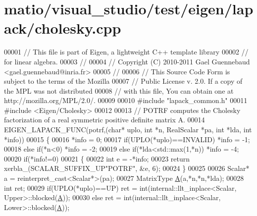 \hypertarget{matio_2visual__studio_2test_2eigen_2lapack_2cholesky_8cpp_source}{}\section{matio/visual\+\_\+studio/test/eigen/lapack/cholesky.cpp}
\label{matio_2visual__studio_2test_2eigen_2lapack_2cholesky_8cpp_source}

\begin{DoxyCode}
00001 \textcolor{comment}{// This file is part of Eigen, a lightweight C++ template library}
00002 \textcolor{comment}{// for linear algebra.}
00003 \textcolor{comment}{//}
00004 \textcolor{comment}{// Copyright (C) 2010-2011 Gael Guennebaud <gael.guennebaud@inria.fr>}
00005 \textcolor{comment}{//}
00006 \textcolor{comment}{// This Source Code Form is subject to the terms of the Mozilla}
00007 \textcolor{comment}{// Public License v. 2.0. If a copy of the MPL was not distributed}
00008 \textcolor{comment}{// with this file, You can obtain one at http://mozilla.org/MPL/2.0/.}
00009 
00010 \textcolor{preprocessor}{#include "lapack\_common.h"}
00011 \textcolor{preprocessor}{#include <Eigen/Cholesky>}
00012 
00013 \textcolor{comment}{// POTRF computes the Cholesky factorization of a real symmetric positive definite matrix A.}
00014 EIGEN\_LAPACK\_FUNC(potrf,(\textcolor{keywordtype}{char}* uplo, \textcolor{keywordtype}{int} *n, RealScalar *pa, \textcolor{keywordtype}{int} *lda, \textcolor{keywordtype}{int} *info))
00015 \{
00016   *info = 0;
00017         \textcolor{keywordflow}{if}(UPLO(*uplo)==INVALID) *info = -1;
00018   \textcolor{keywordflow}{else}  \textcolor{keywordflow}{if}(*n<0)                 *info = -2;
00019   \textcolor{keywordflow}{else}  \textcolor{keywordflow}{if}(*lda<std::max(1,*n))  *info = -4;
00020   \textcolor{keywordflow}{if}(*info!=0)
00021   \{
00022     \textcolor{keywordtype}{int} e = -*info;
00023     \textcolor{keywordflow}{return} xerbla\_(SCALAR\_SUFFIX\_UP\textcolor{stringliteral}{"POTRF"}, &e, 6);
00024   \}
00025 
00026   Scalar* a = \textcolor{keyword}{reinterpret\_cast<}Scalar*\textcolor{keyword}{>}(pa);
00027   MatrixType \hyperlink{group___core___module_class_eigen_1_1_matrix}{A}(a,*n,*n,*lda);
00028   \textcolor{keywordtype}{int} ret;
00029   \textcolor{keywordflow}{if}(UPLO(*uplo)==UP) ret = int(internal::llt\_inplace<Scalar, Upper>::blocked(\hyperlink{group___core___module_class_eigen_1_1_matrix}{A}));
00030   \textcolor{keywordflow}{else}                ret = int(internal::llt\_inplace<Scalar, Lower>::blocked(\hyperlink{group___core___module_class_eigen_1_1_matrix}{A}));

\end{DoxyCode}
